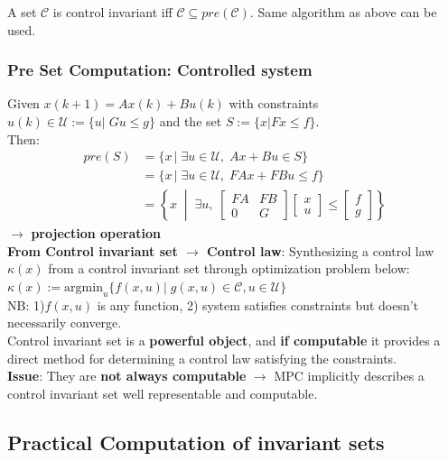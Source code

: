 A set $\mathcal{C}$ is control invariant iff $\mathcal{C}\subseteq pre(\mathcal{C})$. Same algorithm as above
can be used.\\

\subsubsection{Pre Set Computation: Controlled system}
Given $x(k+1)=Ax(k)+Bu(k)$ with constraints $u(k)\in \mathcal{U}:=\{u|\;Gu\leq g\}$ and the set $S:=\{x| Fx\leq f\}$.\\
Then:
\begin{align*}
pre(S) &= \{x\,|\;\exists u\in\mathcal{U},\; Ax+Bu\in S\}\\
&= \{x\,|\;\exists u\in\mathcal{U},\; FAx+FBu\leq f\}\\
&= \left\{ x \;\middle|\; \exists u,\;
\begin{bmatrix}FA & FB \\ 0 & G\end{bmatrix}
\begin{bmatrix}x \\ u \end{bmatrix}
\leq
\begin{bmatrix}f \\ g\end{bmatrix}
\right\}
\end{align*}
$\rightarrow$ \textbf{projection operation}\\
\textbf{From Control invariant set $\rightarrow$ Control law}:
Synthesizing a control law $\kappa(x)$ from a control invariant set through optimization problem below:\\
$\kappa(x):=\text{argmin}_u\{f(x,u)|\;g(x,u)\in\mathcal{C},u\in\mathcal{U}\}$\\
NB: 1)$f(x,u)$ is any function, 2) system satisfies constraints but doesn't necessarily converge.\\
Control invariant set is a \textbf{powerful object}, and \textbf{if computable} it provides a direct method for determining a control law satisfying the constraints.\\
\textbf{Issue}: They are \textbf{not always computable} $\rightarrow$ MPC implicitly describes a control invariant set well representable and computable.

\subsection{Practical Computation of invariant sets}

